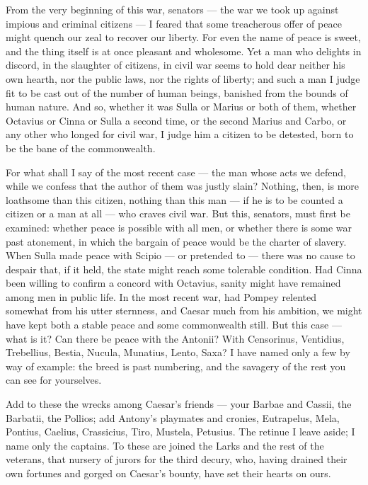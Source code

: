 
 From the very beginning of this war, senators --- the war we took up against impious and criminal citizens --- I feared that some treacherous offer of peace might quench our zeal to recover our liberty. For even the name of peace is sweet, and the thing itself is at once pleasant and wholesome. Yet a man who delights in discord, in the slaughter of citizens, in civil war seems to hold dear neither his own hearth, nor the public laws, nor the rights of liberty; and such a man I judge fit to be cast out of the number of human beings, banished from the bounds of human nature. And so, whether it was Sulla or Marius or both of them, whether Octavius or Cinna or Sulla a second time, or the second Marius and Carbo, or any other who longed for civil war, I judge him a citizen to be detested, born to be the bane of the commonwealth.

 For what shall I say of the most recent case --- the man whose acts we defend, while we confess that the author of them was justly slain? Nothing, then, is more loathsome than this citizen, nothing than this man --- if he is to be counted a citizen or a man at all --- who craves civil war. But this, senators, must first be examined: whether peace is possible with all men, or whether there is some war past atonement, in which the bargain of peace would be the charter of slavery. When Sulla made peace with Scipio --- or pretended to --- there was no cause to despair that, if it held, the state might reach some tolerable condition. Had Cinna been willing to confirm a concord with Octavius, sanity might have remained among men in public life. In the most recent war, had Pompey relented somewhat from his utter sternness, and Caesar much from his ambition, we might have kept both a stable peace and some commonwealth still. But this case --- what is it? Can there be peace with the Antonii? With Censorinus, Ventidius, Trebellius, Bestia, Nucula, Munatius, Lento, Saxa? I have named only a few by way of example: the breed is past numbering, and the savagery of the rest you can see for yourselves.

 Add to these the wrecks among Caesar's friends --- your Barbae and Cassii, the Barbatii, the Pollios; add Antony's playmates and cronies, Eutrapelus, Mela, Pontius, Caelius, Crassicius, Tiro, Mustela, Petusius. The retinue I leave aside; I name only the captains. To these are joined the Larks and the rest of the veterans, that nursery of jurors for the third decury, who, having drained their own fortunes and gorged on Caesar's bounty, have set their hearts on ours.

